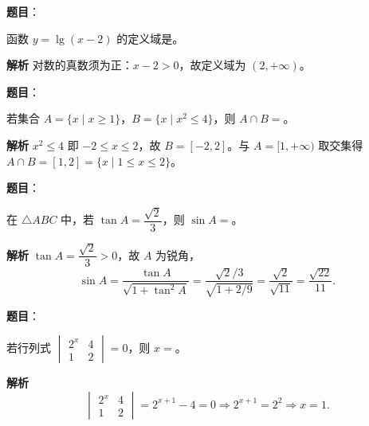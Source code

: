 
\begin{answer}

\textbf{题目}：

函数 $y=\lg(x-2)$ 的定义域是\gkblank{}。

\textbf{解析}
对数的真数须为正：$x-2>0$，故定义域为 $(2,+\infty)$。


\end{answer}
\begin{answer}

\textbf{题目}：

若集合 $A=\{x\mid x\geqslant1\}$，$B=\{x\mid x^2\leqslant4\}$，则 $A\cap B=$\gkblank{}。

\textbf{解析}
$x^2\leqslant4$ 即 $-2\leqslant x\leqslant2$，故 $B=[-2,2]$。与 $A=[1,+\infty)$ 取交集得 $A\cap B=[1,2]=\{x\mid1\leqslant x\leqslant2\}$。


\end{answer}
\begin{answer}

\textbf{题目}：

在 $\triangle ABC$ 中，若 $\tan A=\dfrac{\sqrt2}3$，则 $\sin A=$\gkblank{}。

\textbf{解析}
$\tan A=\dfrac{\sqrt2}3>0$，故 $A$ 为锐角，
\nopagebreak[4]
\[\sin A=\frac{\tan A}{\sqrt{1+\tan^2A}}=\frac{\sqrt2/3}{\sqrt{1+2/9}}=\frac{\sqrt2}{\sqrt{11}}=\frac{\sqrt{22}}{11}.\]


\end{answer}
\begin{answer}

\textbf{题目}：

若行列式 $\begin{vmatrix}2^x&4\\ 1&2\end{vmatrix}=0$，则 $x=$\gkblank{}。

\textbf{解析}
\nopagebreak[4]
\[\begin{vmatrix}2^x&4\\ 1&2\end{vmatrix}=2^{x+1}-4=0\Longrightarrow2^{x+1}=2^2\Longrightarrow x=1.\]


\end{answer}
